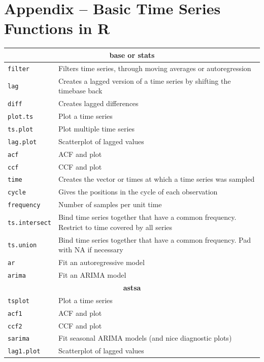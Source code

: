 \section*{Appendix -- Basic Time Series Functions in R}

\renewcommand{\arraystretch}{1.25}
\begin{tabularx}{\textwidth}{l|X} \hline
\multicolumn{2}{c}{\textbf{base or stats}} \\ \hline
\texttt{filter} & Filters time series, through moving averages or autoregression \\
\texttt{lag} & Creates a lagged version of a time series by shifting the timebase back \\
\texttt{diff} & Creates lagged differences \\ 
\texttt{plot.ts} & Plot a time series \\
\texttt{ts.plot} & Plot multiple time series \\
\texttt{lag.plot} & Scatterplot of lagged values \\
\texttt{acf} & ACF and plot \\
\texttt{ccf} & CCF and plot \\ 
\texttt{time} & Creates the vector or times at which a time series was sampled \\
\texttt{cycle} & Gives the positions in the cycle of each observation \\
\texttt{frequency} & Number of samples per unit time \\
\texttt{ts.intersect} & Bind time series together that have a common frequency. Restrict to time covered by all series \\
\texttt{ts.union} & Bind time series together that have a common frequency. Pad with NA if necessary \\ 
\texttt{ar} & Fit an autoregressive model \\ 
\texttt{arima} & Fit an ARIMA model \\ \hline
\multicolumn{2}{c}{\textbf{astsa}} \\ \hline
\texttt{tsplot} & Plot a time series \\
\texttt{acf1} & ACF and plot \\
\texttt{ccf2} & CCF and plot \\
\texttt{sarima} & Fit seasonal ARIMA models (and nice diagnostic plots) \\
\texttt{lag1.plot} & Scatterplot of lagged values \\ \hline
\end{tabularx}

